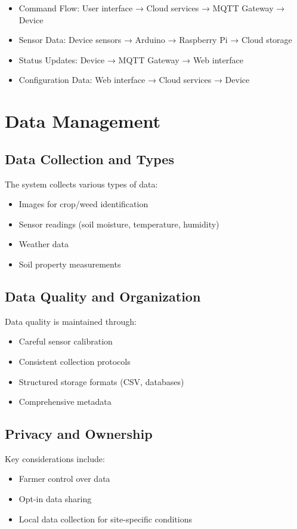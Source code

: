 \begin{itemize}
    \item Command Flow: User interface → Cloud services → MQTT Gateway → Device
    \item Sensor Data: Device sensors → Arduino → Raspberry Pi → Cloud storage
    \item Status Updates: Device → MQTT Gateway → Web interface
    \item Configuration Data: Web interface → Cloud services → Device
\end{itemize}

\section{Data Management}

\subsection{Data Collection and Types}

The system collects various types of data:
\begin{itemize}
\item Images for crop/weed identification
\item Sensor readings (soil moisture, temperature, humidity)
\item Weather data
\item Soil property measurements
\end{itemize}

\subsection{Data Quality and Organization}

Data quality is maintained through:
\begin{itemize}
\item Careful sensor calibration
\item Consistent collection protocols
\item Structured storage formats (CSV, databases)
\item Comprehensive metadata
\end{itemize}

\subsection{Privacy and Ownership}

Key considerations include:
\begin{itemize}
\item Farmer control over data
\item Opt-in data sharing
\item Local data collection for site-specific conditions
\end{itemize}

